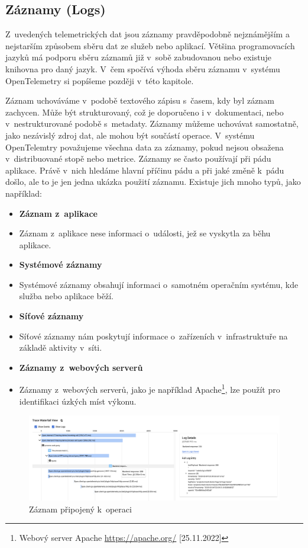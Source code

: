 \subsection{Záznamy (Logs)}
Z~uvedených telemetrických dat jsou záznamy \cite{Logs} pravděpodobně nejznámějším a nejstarším způsobem sběru dat ze služeb nebo aplikací. Většina programovacích jazyků má podporu sběru záznamů již v~sobě zabudovanou nebo existuje knihovna pro daný jazyk. V~čem spočívá výhoda sběru záznamu v~systému OpenTelemetry si popíšeme později v~této kapitole.

Záznam uchováváme v~podobě textového zápisu s~časem, kdy byl záznam zachycen. Může být strukturovaný, což je doporučeno i v~dokumentaci, nebo v~nestrukturované podobě s~metadaty. Záznamy můžeme uchovávat samostatně, jako nezávislý zdroj dat, ale mohou být součástí operace. V~systému OpenTelemtry považujeme všechna data za záznamy, pokud nejsou obsažena v~distribuované stopě nebo metrice. Záznamy se často používají při pádu aplikace. Právě v~nich hledáme hlavní příčinu pádu a při jaké změně k~pádu došlo, ale to je jen jedna ukázka použití záznamu. Existuje jich mnoho typů, jako například:
    \begin{itemize}
        \item{\textbf{Záznam z~aplikace}}
        \item[]
        Záznam z~aplikace nese informaci o~události, jež se vyskytla za běhu aplikace.
        \item{\textbf{Systémové záznamy}}
        \item[]
        Systémové záznamy obsahují informaci o~samotném operačním systému, kde služba nebo aplikace běží.
        \item{\textbf{Síťové záznamy}}
        \item[]
        Síťové záznamy nám poskytují informace o~zařízeních v~infrastruktuře na základě aktivity v~síti.
        \item{\textbf{Záznamy z~webových serverů}}
        \item[]
        Záznamy z~webových serverů, jako je například Apache\footnote{Webový server Apache \url{https://apache.org/} [25.11.2022]}, lze použít pro identifikaci úzkých míst výkonu.
    \end{itemize}

\begin{figure}[h]
  \centering
  \includegraphics[width=15cm]{obrazky-figures/logSpan.png}
  \caption{Záznam připojený k~operaci\protect\footnotemark}
  \label{fig:log}
\end{figure}

